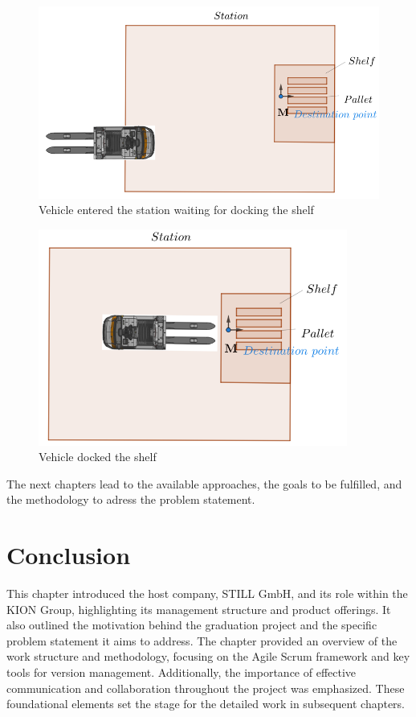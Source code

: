 \begin{figure}[H]
    \begin{center}
        \includegraphics[width=5in]{images/Chap0/dock_wait.png}
        \caption{Vehicle entered the station waiting for docking the shelf}
        \label{dock_wait}
       \end{center}
\end{figure}
\begin{figure}[H]
    \begin{center}
        \includegraphics[width=4in]{images/Chap0/dock_done.png}
        \caption{Vehicle docked the shelf}
        \label{dock_done}
       \end{center}
\end{figure}

The next chapters lead to the available approaches, the goals to be fulfilled, and the methodology to adress
the problem statement.


\section*{Conclusion}
This chapter introduced the host company, STILL GmbH, and its role within the KION Group, highlighting its 
management structure and product offerings. It also outlined the motivation behind the graduation project 
and the specific problem statement it aims to address. The chapter provided an overview of the work structure 
and methodology, focusing on the Agile Scrum framework and key tools for version management. Additionally, 
the importance of effective communication and collaboration throughout the project was emphasized. These 
foundational elements set the stage for the detailed work in subsequent chapters.